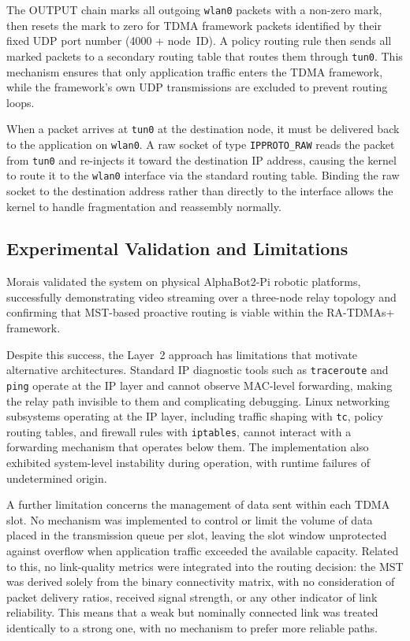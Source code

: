 The OUTPUT chain marks all outgoing \texttt{wlan0} packets with a non-zero mark, then
resets the mark to zero for TDMA framework packets identified by their fixed UDP port number
(4000 + node~ID). A policy routing rule then sends all marked packets to a secondary routing
table that routes them through \texttt{tun0}. This mechanism ensures that only application
traffic enters the TDMA framework, while the framework's own UDP transmissions are excluded
to prevent routing loops.

When a packet arrives at \texttt{tun0} at the destination node, it must be delivered back to the
application on \texttt{wlan0}. A raw socket of type \texttt{IPPROTO\_RAW} reads the packet
from \texttt{tun0} and re-injects it toward the destination IP address, causing the kernel to
route it to the \texttt{wlan0} interface via the standard routing table. Binding the raw socket to
the destination address rather than directly to the interface allows the kernel to handle
fragmentation and reassembly normally.

\FloatBarrier
\subsection{Experimental Validation and Limitations}

Morais validated the system on physical AlphaBot2-Pi robotic platforms, successfully
demonstrating video streaming over a three-node relay topology and confirming that MST-based
proactive routing is viable within the RA-TDMAs+ framework.

Despite this success, the Layer~2 approach has limitations that motivate alternative
architectures. Standard IP diagnostic tools such as \texttt{traceroute} and \texttt{ping} operate
at the IP layer and cannot observe MAC-level forwarding, making the relay path invisible to
them and complicating debugging. Linux networking subsystems operating at the IP layer,
including traffic shaping with \texttt{tc}, policy routing tables, and firewall rules with
\texttt{iptables}, cannot interact with a forwarding mechanism that operates below them.
The implementation also exhibited system-level instability during operation, with runtime
failures of undetermined origin.

A further limitation concerns the management of data sent within each TDMA slot. No
mechanism was implemented to control or limit the volume of data placed in the transmission
queue per slot, leaving the slot window unprotected against overflow when application traffic
exceeded the available capacity. Related to this, no link-quality metrics were integrated into
the routing decision: the MST was derived solely from the binary connectivity matrix, with no
consideration of packet delivery ratios, received signal strength, or any other indicator of
link reliability. This means that a weak but nominally connected link was treated identically to
a strong one, with no mechanism to prefer more reliable paths.

